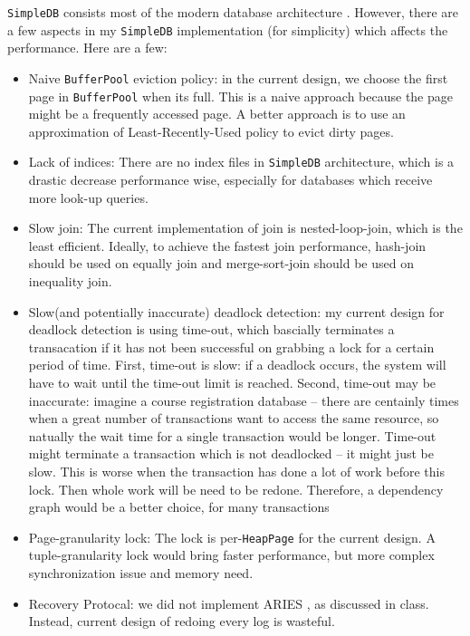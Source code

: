 \documentclass[12pt]{myland}
\def\<#1>{\texttt{#1}}
\begin{document}
    \<SimpleDB> consists most of the modern database architecture \cite{lecture3}. However, there are a
    few aspects in my \<SimpleDB> implementation (for simplicity) which affects the performance. Here are a few:
    \begin{itemize}
        \item Naive \<BufferPool> eviction policy: in the current design, we choose the first page in \<BufferPool> when
            its full. This is a naive approach because the page might be a frequently accessed page. A better approach
            is to use an approximation of Least-Recently-Used policy to evict dirty pages.
        \item Lack of indices: There are no index files in \<SimpleDB> architecture, which is a drastic decrease performance
            wise, especially for databases which receive more look-up queries.
        \item Slow join: The current implementation of join is nested-loop-join, which is the least efficient. Ideally,
            to achieve the fastest join performance, hash-join should be used on equally join and merge-sort-join should
            be used on inequality join.
        \item Slow(and potentially inaccurate) deadlock detection: my current design for deadlock detection is using
            time-out, which bascially terminates a transacation if it has not been successful on grabbing a lock for a
            certain period of time. First, time-out is slow: if a deadlock occurs, the system will have to wait until the
            time-out limit is reached. Second, time-out may be inaccurate: imagine a course registration database -- there
            are centainly times when a great number of transactions want to access the same resource, so natually the
            wait time for a single transaction would be longer. Time-out might terminate a transaction which is not deadlocked --
            it might just be slow. This is worse when the transaction has done a lot of work before this lock. Then whole
            work will be need to be redone. Therefore, a dependency graph would be a better choice, for many transactions
        \item Page-granularity lock: The lock is per-\<HeapPage> for the current design. A tuple-granularity lock would
            bring faster performance, but more complex synchronization issue and memory need.
        \item Recovery Protocal: we did not implement ARIES \cite{lecture18}, as discussed in class.
            Instead, current design of redoing every log is wasteful.
    \end{itemize}
\end{document}
